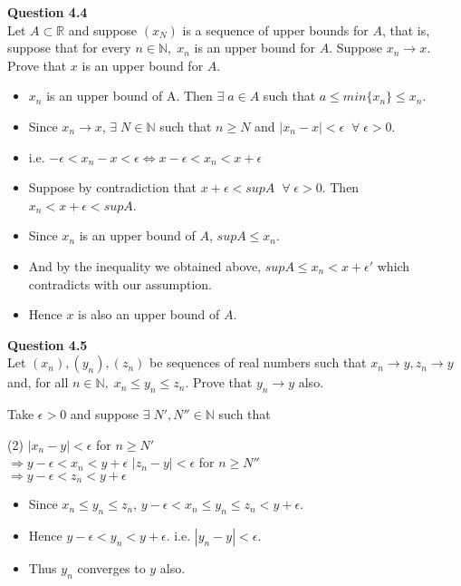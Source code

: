 \documentclass[12pt]{article}
\begin{document}
\textbf{Question 4.4}\\
Let $A\subset \mathbb{R}$ and suppose $(x_N)$ is a sequence of upper bounds for $A$, that is, suppose that for every $n\in \mathbb{N},\; x_n$ is an upper bound for $A$. Suppose $x_n \rightarrow x$. Prove that $x$ is an upper bound for $A$.
\begin{itemize}
    \item $x_n$ is an upper bound of A. Then $\exists\; a\in A$ such that $a \le min\{x_n\} \le x_n$.
    
    \item Since $x_n \rightarrow x$, $\exists\; N\in \mathbb{N}$ such that $n\ge N$ and $|x_n - x| < \epsilon \;\; \forall \;\epsilon > 0$.
    
    \item i.e. $-\epsilon < x_n - x < \epsilon \Leftrightarrow x - \epsilon < x_n < x + \epsilon$\\
    
    \item Suppose by contradiction that $x+\epsilon  < supA\;\;\forall\;\epsilon>0$. Then $x_n < x + \epsilon < supA$. 
    \item Since $x_n$ is an upper bound of $A$, $supA \le x_n$.
    \item And by the inequality we obtained above, $supA\le x_n < x+\epsilon'$ which contradicts with our assumption.
    \item Hence $x$ is also an upper bound of $A$.
\end{itemize}

\newpage
\textbf{Question 4.5}\\
Let $(x_n), (y_n), (z_n)$ be sequences of real numbers such that $x_n \rightarrow y, z_n \rightarrow y$ and, for all $n\in \mathbb{N},\; x_n \le y_n \le z_n.$ Prove that $y_n \rightarrow y$ also.

\vspace{1.5\baselineskip}
Take $\epsilon>0$ and suppose $\exists\; N',N'' \in \mathbb{N}$ such that
\begin{tasks}(2)
    \task $|x_n - y| < \epsilon$ for $n\ge N'$\\
    $\Rightarrow y-\epsilon < x_n < y + \epsilon$
    \task $|z_n - y| < \epsilon$ for $n\ge N''$\\
    $\Rightarrow y-\epsilon < z_n < y + \epsilon$
\end{tasks}
\begin{itemize}
    \item Since $ x_n \le y_n \le z_n$,\; $y-\epsilon < x_n \le y_n \le z_n < y+\epsilon$.
    \item Hence $y-\epsilon < y_n < y+\epsilon$. i.e. $|y_n - y| < \epsilon$.
    \item Thus $y_n$ converges to $y$ also.
\end{itemize}
\end{document}
